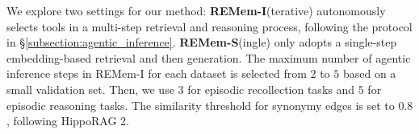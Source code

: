 \documentclass{article} %
\newcommand{\ours}{REMem\xspace}
\begin{document}
We explore two settings for our method: \textbf{\ours-I}(terative) autonomously selects tools in a multi-step retrieval and reasoning process, following the protocol in \S \ref{subsection:agentic_inference}. \textbf{\ours-S}(ingle) only adopts a single-step embedding-based retrieval and then generation.
The maximum number of agentic inference steps in \ours-I for each dataset is selected from $2$ to $5$ based on a small validation set. Then, we use $3$ for episodic recollection tasks and $5$ for episodic reasoning tasks.
The similarity threshold for synonymy edges is set to $0.8$, following HippoRAG 2.
\end{document}
